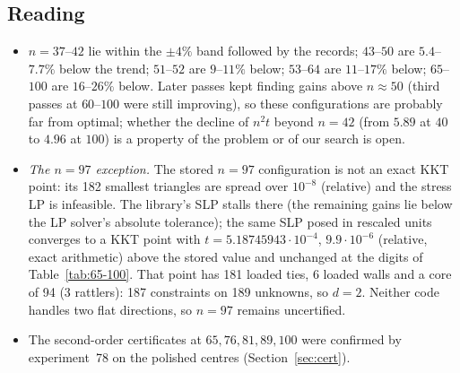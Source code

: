 \documentclass[11pt]{amsart}
\theoremstyle{definition}
\begin{document}
\subsection{Reading}
\begin{itemize}
\item $n = 37$--$42$ lie within the $\pm4\%$ band followed by the records; $43$--$50$ are $5.4$--$7.7\%$ below the trend; $51$--$52$ are $9$--$11\%$ below; $53$--$64$ are $11$--$17\%$ below; $65$--$100$ are $16$--$26\%$ below. %
Later passes kept finding gains above $n \approx 50$ (third passes at $60$--$100$ were still improving), so these configurations are probably far from optimal; whether the decline of $n^2t$ beyond $n = 42$ (from $5.89$ at $40$ to $4.96$ at $100$) is a property of the problem or of our search is open. %
\item \emph{The $n = 97$ exception.} The stored $n = 97$ configuration is not an exact KKT point: its 182 smallest triangles are spread over $10^{-8}$ (relative) and the stress LP is infeasible. The library's SLP stalls there (the remaining gains lie below the LP solver's absolute tolerance); the same SLP posed in rescaled units converges to a KKT point with $t = 5.18745943\cdot10^{-4}$, $9.9\cdot10^{-6}$ (relative, exact arithmetic) above the stored value and unchanged at the digits of Table~\ref{tab:65-100}. That point has 181 loaded ties, 6 loaded walls and a core of 94 (3 rattlers): 187 constraints on 189 unknowns, so $d = 2$. Neither code handles two flat directions, so $n = 97$ remains uncertified. %
\item The second-order certificates at $65, 76, 81, 89, 100$ were confirmed by experiment~78 on the polished centres (Section~\ref{sec:cert}). %
\end{itemize}
\end{document}

